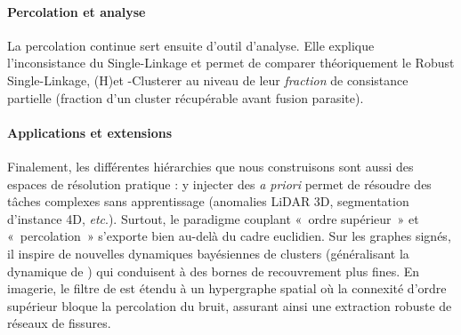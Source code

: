 \begin{AbstractPage}
\begin{resume}
\paragraph{Percolation et analyse}
La percolation continue sert ensuite d'outil d'analyse. Elle explique l'inconsistance du Single-Linkage et permet de comparer théoriquement le Robust Single-Linkage, (H)\DBSCAN et \HGP-Clusterer au niveau de leur \emph{fraction} de consistance partielle (fraction d'un cluster récupérable avant fusion parasite). 



\paragraph{Applications et extensions}
Finalement, les différentes hiérarchies que nous construisons sont aussi des espaces de résolution pratique : y injecter des \emph{a priori} permet de résoudre des tâches complexes sans apprentissage (anomalies LiDAR 3D, segmentation d'instance 4D, \emph{etc}.). Surtout, le paradigme couplant «~ordre supérieur~» et «~percolation~» s'exporte bien au-delà du cadre euclidien. Sur les graphes signés, il inspire de nouvelles dynamiques bayésiennes de clusters (généralisant la dynamique de ) qui conduisent à des bornes de recouvrement plus fines. En imagerie, le filtre de  est étendu à un hypergraphe spatial où la connexité d'ordre supérieur bloque la percolation du bruit, assurant ainsi une extraction robuste de réseaux de fissures.



\end{resume}
\end{AbstractPage}

